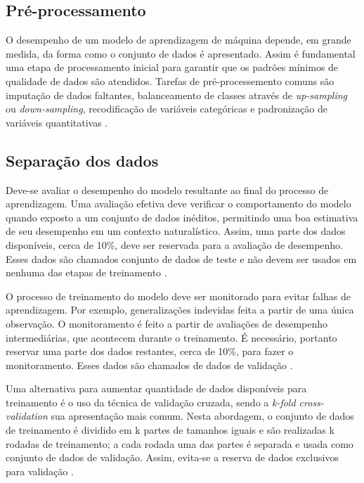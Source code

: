 \subsection{Pré-processamento}

O desempenho de um modelo de aprendizagem de máquina depende, em grande medida, da forma como o conjunto de dados é apresentado. Assim é fundamental uma etapa
de processamento inicial para garantir que os padrões mínimos de qualidade de dados são atendidos. Tarefas de pré-processemento comuns são imputação de dados
faltantes, balanceamento de classes através de \textit{up-sampling} ou \textit{down-sampling}, recodificação de variáveis categóricas e padronização
de variáveis quantitativas \cite{Delgadillo2020}.

\subsection{Separação dos dados}

Deve-se avaliar o desempenho do modelo resultante ao final do processo de aprendizagem. Uma avaliação efetiva deve verificar o comportamento do modelo quando
exposto a um conjunto de dados inéditos, permitindo uma boa estimativa de seu desempenho em um contexto naturalístico. Assim, uma parte dos dados disponíveis,
cerca de 10\%, deve ser reservada para a avaliação de desempenho. Esses dados são chamados conjunto de dados de teste e não devem ser usados em nenhuma das
etapas de treinamento \cite{Greener2021}. 

O processo de treinamento do modelo deve ser monitorado para evitar falhas de aprendizagem. Por exemplo, generalizações indevidas feita a partir de uma única
observação.  O monitoramento é feito a partir de avaliações de desempenho intermediárias, que acontecem durante o treinamento. É necessário, portanto reservar
uma parte dos dados restantes, cerca de 10\%, para fazer o monitoramento. Esses dados são chamados de dados de validação \cite{Greener2021}.

Uma alternativa para aumentar quantidade de dados disponíveis para treinamento é o uso da técnica de validação cruzada, sendo a \textit{k-fold cross-validation}
sua apresentação mais comum. Nesta abordagem, o conjunto de dados de treinamento é dividido em k partes de tamanhos iguais e são realizadas k rodadas de treinamento;
a cada rodada uma das partes é separada e usada como conjunto de dados de validação. Assim, evita-se a reserva de dados exclusivos para validação \cite{Delgadillo2020}.

